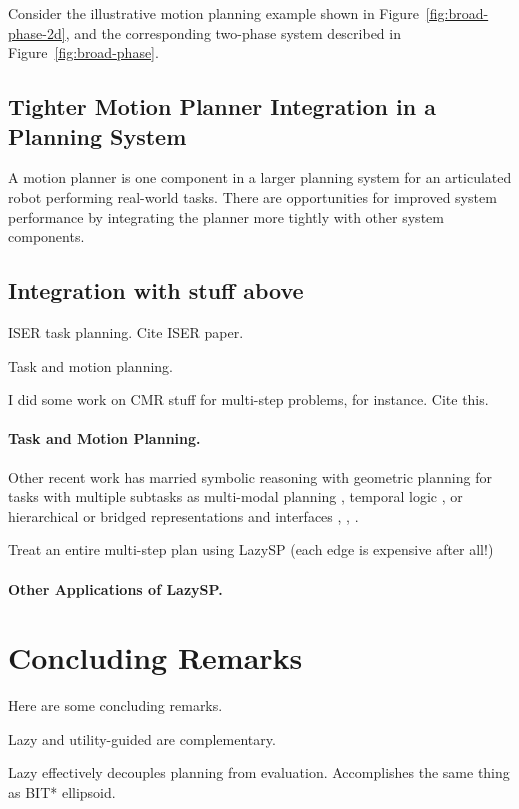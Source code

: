 Consider the illustrative motion planning example shown
in Figure~\ref{fig:broad-phase-2d},
and the corresponding two-phase system described
in Figure~\ref{fig:broad-phase}.


\subsection{Tighter Motion Planner Integration in a Planning System}

A motion planner is one component in a larger planning system for
an articulated robot performing real-world tasks.
There are opportunities for improved system performance by
integrating the planner more tightly with other system components.

\subsection{Integration with stuff above}

ISER task planning.
Cite ISER paper.

Task and motion planning.

I did some work on CMR stuff for multi-step problems,
for instance.
Cite this.

\paragraph{Task and Motion Planning.}
Other recent work has married symbolic reasoning with geometric planning
for tasks with multiple subtasks
as multi-modal planning \citep{hauser2010multi},
temporal logic \citep{bhatia2010temporalgoals},
or hierarchical or bridged representations and interfaces
\citep{cambon2009hybrid}, \citep{gravot2005asymov},
\citep{srivastava2014taskmotion}.

Treat an entire multi-step plan using LazySP (each edge is expensive after all!)

\paragraph{Other Applications of LazySP.}

\section{Concluding Remarks}
\label{sec:conclusion:remarks}

Here are some concluding remarks.

Lazy and utility-guided are complementary.

Lazy effectively decouples planning from evaluation.
Accomplishes the same thing as BIT* ellipsoid.
